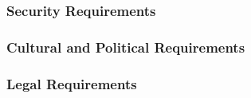 \documentclass[12pt]{article}
\begin{document}
\subsubsection{Security Requirements}
\subsubsection{Cultural and Political Requirements}
\subsubsection{Legal Requirements}

\noindent \begin{itemize}

 




\end{itemize}
\end{document}

